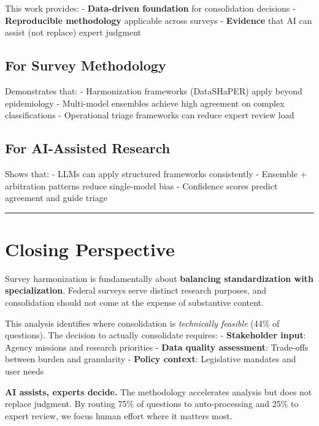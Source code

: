 \documentclass[
  letterpaper,
]{report}
\begin{document}
This work provides: - \textbf{Data-driven foundation} for consolidation
decisions - \textbf{Reproducible methodology} applicable across surveys
- \textbf{Evidence} that AI can assist (not replace) expert judgment

\subsection{For Survey Methodology}\label{for-survey-methodology}

Demonstrates that: - Harmonization frameworks (DataSHaPER) apply beyond
epidemiology - Multi-model ensembles achieve high agreement on complex
classifications - Operational triage frameworks can reduce expert review
load

\subsection{For AI-Assisted Research}\label{for-ai-assisted-research}

Shows that: - LLMs can apply structured frameworks consistently -
Ensemble + arbitration patterns reduce single-model bias - Confidence
scores predict agreement and guide triage

\begin{center}\rule{0.5\linewidth}{0.5pt}\end{center}

\section{Closing Perspective}\label{closing-perspective}

Survey harmonization is fundamentally about \textbf{balancing
standardization with specialization}. Federal surveys serve distinct
research purposes, and consolidation should not come at the expense of
substantive content.

This analysis identifies where consolidation is \emph{technically
feasible} (44\% of questions). The decision to actually consolidate
requires: - \textbf{Stakeholder input}: Agency missions and research
priorities - \textbf{Data quality assessment}: Trade-offs between burden
and granularity - \textbf{Policy context}: Legislative mandates and user
needs

\textbf{AI assists, experts decide.} The methodology accelerates
analysis but does not replace judgment. By routing 75\% of questions to
auto-processing and 25\% to expert review, we focus human effort where
it matters most.
\end{document}
